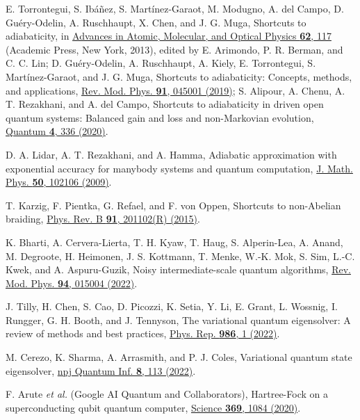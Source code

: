 \documentclass[aps,pra,twocolumn,floatfix,groupedaddress,superscriptaddress,nofootinbib,notitlepage]{revtex4-2}
\begin{document}
\begin{thebibliography}{100}
 E. Torrontegui, S. Ib\'{a}\~{n}ez, S. Mart\'{i}nez-Garaot, M. Modugno, A. del Campo, D. Gu\'{e}ry-Odelin, A. Ruschhaupt, X. Chen, and J. G. Muga, Shortcuts to adiabaticity, in \href{https://doi.org/10.1016/B978-0-12-408090-4.00002-5}{Advances in Atomic, Molecular, and Optical Physics \textbf{62}, 117} (Academic Press, New York, 2013), edited by E. Arimondo, P. R. Berman, and C. C. Lin; D. Gu\'{e}ry-Odelin, A. Ruschhaupt, A. Kiely, E. Torrontegui, S. Mart\'{i}nez-Garaot, and J. G. Muga, Shortcuts to adiabaticity: Concepts, methods, and applications, \href{https://doi.org/10.1103/RevModPhys.91.045001}{Rev. Mod. Phys. \textbf{91}, 045001 (2019)}; S. Alipour, A. Chenu, A. T. Rezakhani, and A. del Campo, Shortcuts to adiabaticity in driven open quantum systems: Balanced gain and loss and non-Markovian evolution, \href{https://doi.org/10.22331/q-2020-09-28-336}{Quantum \textbf{4}, 336 (2020)}.

 D. A. Lidar, A. T. Rezakhani, and A. Hamma, Adiabatic approximation with exponential accuracy for manybody systems and quantum computation, \href{https://doi.org/10.1063/1.3236685}{J. Math. Phys. \textbf{50}, 102106 (2009)}.

 T. Karzig, F. Pientka, G. Refael, and F. von Oppen, Shortcuts to non-Abelian braiding, \href{https://doi.org/10.1103/PhysRevB.91.201102}{Phys. Rev. B \textbf{91}, 201102(R) (2015)}.

K. Bharti, A. Cervera-Lierta, T. H. Kyaw, T. Haug, S. Alperin-Lea, A. Anand, M. Degroote, H. Heimonen, J. S. Kottmann, T. Menke, W.-K. Mok, S. Sim, L.-C. Kwek, and A. Aspuru-Guzik, Noisy intermediate-scale quantum algorithms, \href{https://doi.org/10.1103/RevModPhys.94.015004}{Rev. Mod. Phys. \textbf{94}, 015004 (2022)}.

 J. Tilly, H. Chen, S. Cao, D. Picozzi, K. Setia, Y. Li, E. Grant, L. Wossnig, I. Rungger, G. H. Booth, and J. Tennyson, The variational quantum eigensolver: A review of methods and best practices, \href{https://doi.org/10.1016/j.physrep.2022.08.003}{Phys. Rep. \textbf{986}, 1 (2022)}.

 M. Cerezo, K. Sharma, A. Arrasmith, and P. J. Coles, Variational quantum state eigensolver, \href{https://doi.org/10.1038/s41534-022-00611-6}{npj Quantum Inf. \textbf{8}, 113 (2022)}.

 F. Arute \textit{et al.} (Google AI Quantum and Collaborators), Hartree-Fock on a superconducting qubit quantum computer, \href{https://doi.org/10.1126/science.abb9811}{Science \textbf{369}, 1084 (2020)}.


\end{thebibliography}
\end{document}
